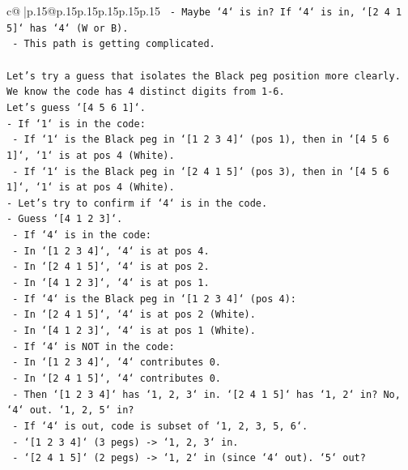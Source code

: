 \documentclass{article}
\begin{document}
{\begin{supertabular}{c@{$\;$}|p{.15\linewidth}@{}p{.15\linewidth}p{.15\linewidth}p{.15\linewidth}p{.15\linewidth}p{.15\linewidth}}
{{{\texttt{                {-} Maybe `4` is in? If `4` is in, `{[}2 4 1 5{]}` has `4` (W or B).} \\
\texttt{                {-} This path is getting complicated.} \\
\\ 
\texttt{Let's try a guess that isolates the Black peg position more clearly.} \\
\texttt{We know the code has 4 distinct digits from 1{-}6.} \\
\texttt{Let's guess `{[}4 5 6 1{]}`.} \\
\texttt{{-} If `1` is in the code:} \\
\texttt{    {-} If `1` is the Black peg in `{[}1 2 3 4{]}` (pos 1), then in `{[}4 5 6 1{]}`, `1` is at pos 4 (White).} \\
\texttt{    {-} If `1` is the Black peg in `{[}2 4 1 5{]}` (pos 3), then in `{[}4 5 6 1{]}`, `1` is at pos 4 (White).} \\
\texttt{{-} Let's try to confirm if `4` is in the code.} \\
\texttt{{-} Guess `{[}4 1 2 3{]}`.} \\
\texttt{    {-} If `4` is in the code:} \\
\texttt{        {-} In `{[}1 2 3 4{]}`, `4` is at pos 4.} \\
\texttt{        {-} In `{[}2 4 1 5{]}`, `4` is at pos 2.} \\
\texttt{        {-} In `{[}4 1 2 3{]}`, `4` is at pos 1.} \\
\texttt{    {-} If `4` is the Black peg in `{[}1 2 3 4{]}` (pos 4):} \\
\texttt{        {-} In `{[}2 4 1 5{]}`, `4` is at pos 2 (White).} \\
\texttt{        {-} In `{[}4 1 2 3{]}`, `4` is at pos 1 (White).} \\
\texttt{    {-} If `4` is NOT in the code:} \\
\texttt{        {-} In `{[}1 2 3 4{]}`, `4` contributes 0.} \\
\texttt{        {-} In `{[}2 4 1 5{]}`, `4` contributes 0.} \\
\texttt{        {-} Then `{[}1 2 3 4{]}` has `1, 2, 3` in. `{[}2 4 1 5{]}` has `1, 2` in? No, `4` out. `1, 2, 5` in?} \\
\texttt{        {-} If `4` is out, code is subset of `1, 2, 3, 5, 6`.} \\
\texttt{        {-} `{[}1 2 3 4{]}` (3 pegs) {-}> `1, 2, 3` in.} \\
\texttt{        {-} `{[}2 4 1 5{]}` (2 pegs) {-}> `1, 2` in (since `4` out). `5` out?} \\
}}}
\end{supertabular}}
\end{document}
